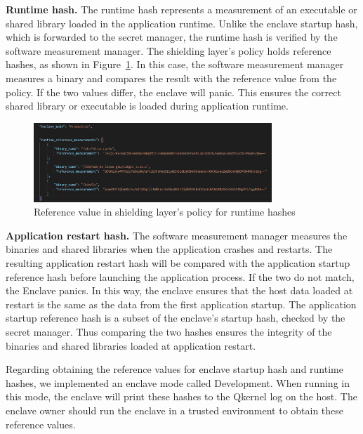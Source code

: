 \textbf{Runtime hash.} The runtime hash represents a measurement of an executable or shared library loaded in the application runtime. Unlike the enclave startup hash, which is forwarded to the secret manager, the runtime hash is verified by the software measurement manager. The shielding layer's policy holds reference hashes, as shown in Figure~\ref{fig:measurement}. In this case, 
the software measurement manager measures a binary and compares the result with the reference value from the policy. If the two values differ, the enclave will panic. This ensures the correct shared library or executable is loaded during application runtime.
\begin{figure}[!htb]
    \centering
    \includegraphics[width=0.8\textwidth]{images/measurement.png}
    \caption[Reference value in shielding layer's policy for runtime hashes]{Reference value in shielding layer's policy for runtime hashes}
    \label{fig:measurement}
\end{figure}

\textbf{Application restart hash.} The software measurement manager measures the binaries and shared libraries when the application crashes and restarts. The resulting application restart hash will be compared with the application startup reference hash before launching the application process. If the two do not match, the Enclave panics. In this way, the enclave 
ensures that the host data loaded at restart is the same as the data from the first application startup. The application startup reference hash is a subset of the enclave's startup hash, checked by the secret manager. Thus comparing the two hashes ensures the integrity of the binaries and shared libraries loaded at application restart. 

Regarding obtaining the reference values for enclave startup hash and runtime hashes, we implemented an enclave mode called Development. When running in this mode, the enclave will print these hashes to the Qkernel log on the host. The enclave owner should run the enclave in a trusted environment to obtain these reference values.

